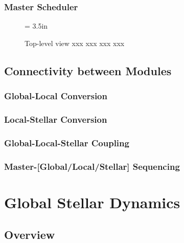 \documentclass{article}[12pt]
\def\filler{xxxx xxxx xxxx xxxx xxxx xxxx xxxx xxxx xxxx xxxx xxxx xxxx
xxxx xxxx xxxx xxxx xxxx xxxx xxxx xxxx xxxx xxxx xxxx xxxx
xxxx xxxx xxxx xxxx xxxx xxxx xxxx xxxx xxxx xxxx xxxx xxxx
xxxx xxxx xxxx xxxx xxxx xxxx xxxx xxxx xxxx xxxx xxxx xxxx
xxxx xxxx xxxx xxxx xxxx xxxx xxxx xxxx xxxx xxxx xxxx xxxx
xxxx xxxx xxxx xxxx xxxx xxxx xxxx xxxx xxxx xxxx xxxx xxxx
xxxx xxxx xxxx xxxx xxxx xxxx xxxx xxxx xxxx xxxx xxxx xxxx
xxxx xxxx xxxx xxxx xxxx xxxx xxxx xxxx xxxx xxxx xxxx xxxx}
\def\filler{}
\begin{document}
\subsubsection{Master Scheduler}

\begin{figure}[htb]
\begin{center}
\epsfxsize = 3.5in
\caption
{Top-level view xxx xxx xxx xxx}
\label{fig:top3}
\end{center}
\end{figure}

\filler

\subsection{Connectivity between Modules}

\filler

\subsubsection{Global-Local Conversion}

\filler

\subsubsection{Local-Stellar Conversion}

\filler

\subsubsection{Global-Local-Stellar Coupling}

\filler

\subsubsection{Master-[Global/Local/Stellar] Sequencing}

\filler

\clearpage
\newpage

\section{Global Stellar Dynamics}

\filler

\subsection{Overview}
\end{document}
